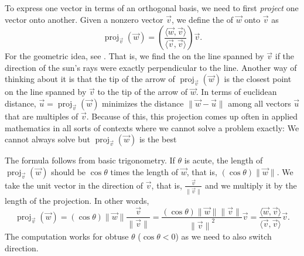 To express one vector in terms of an orthogonal basis, we need to first
\emph{project} one vector onto another.
Given a nonzero vector $\vec{v}$, we define the
\emph{}
of $\vec{w}$ onto $\vec{v}$ as
\begin{equation*}
\operatorname{proj}_{\vec{v}}(\vec{w})
=
\left(
\frac{\langle \vec{w} , \vec{v} \rangle}{ \langle \vec{v} , \vec{v} \rangle}
\right)
\vec{v} .
\end{equation*}
For the geometric idea, see .  That is, we
find the  on the line spanned by $\vec{v}$ if the
direction of the sun's rays
were exactly perpendicular to the line.
Another way of thinking about it is that the tip of the arrow of
$\operatorname{proj}_{\vec{v}}(\vec{w})$ is the closest point on the line
spanned by $\vec{v}$ to the tip of the arrow of $\vec{w}$.
In terms of euclidean distance,
$\vec{u} = \operatorname{proj}_{\vec{v}}(\vec{w})$ minimizes the
distance
$\lVert \vec{w} - \vec{u} \rVert$ among all vectors $\vec{u}$ that are
multiples of $\vec{v}$.
Because of this, this projection comes up often in applied
mathematics in all sorts of contexts where we cannot solve a problem
exactly: We cannot always solve
but $\operatorname{proj}_{\vec{v}}(\vec{w})$ is the best 

\begin{myfig}
\capstart
{}
\caption{Orthogonal projection.\label{vec-orthoproj:fig}}
\end{myfig}

The formula follows from basic trigonometry.  If $\theta$ is acute, the length of
$\operatorname{proj}_{\vec{v}}(\vec{w})$ should be
$\cos \theta$ times the length of $\vec{w}$, that is, $(\cos
\theta)\lVert\vec{w}\rVert$.
We take the unit vector in the direction of $\vec{v}$, that is,
$\frac{\vec{v}}{\lVert \vec{v} \rVert}$ and we multiply it by the length of
the projection.  In other words,
\begin{equation*}
\operatorname{proj}_{\vec{v}}(\vec{w})
=
(\cos \theta) \lVert \vec{w} \rVert
\frac{\vec{v}}{\lVert \vec{v} \rVert}
=
\frac{(\cos \theta) \lVert \vec{w} \rVert \lVert \vec{v} \rVert}{
{\lVert \vec{v} \rVert}^2
}
\vec{v}
=
\frac{\langle \vec{w}, \vec{v} \rangle}{
\langle \vec{v}, \vec{v} \rangle
}
\vec{v} .
\end{equation*}
The computation works for obtuse $\theta$ ($\cos \theta < 0$)
as we need to also switch direction.

